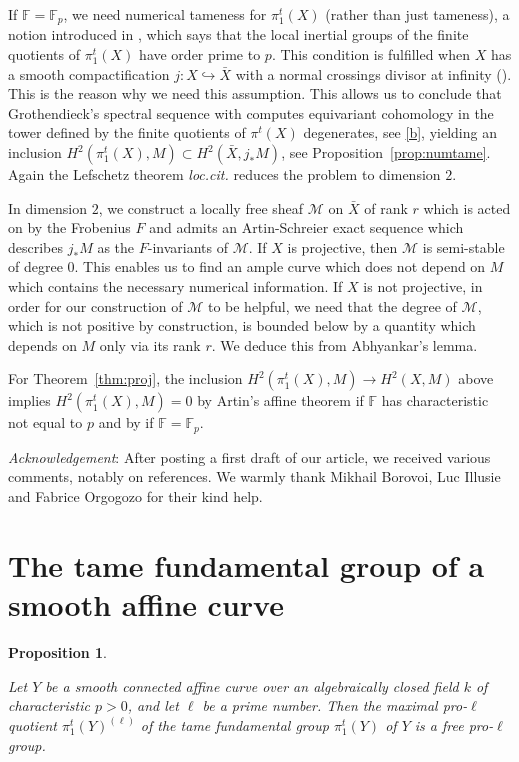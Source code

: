 \documentclass[12pt]{amsart}
\theoremstyle{plain}
\newtheorem{prop}[thm]{Proposition}
\theoremstyle{definition}
\numberwithin{thm}{section}
\newcommand{\sM}{{\mathcal M}}
\newcommand{\F}{{\mathbb F}}
\numberwithin{equation}{section}
\begin{document}
If $\F=\F_p$, we need numerical tameness for $\pi^t_1(X)$ (rather than just tameness), a notion introduced in \cite[Section~5]{KS10}, which says that the local inertial groups of the finite quotients of $\pi^t_1(X)$ have order prime to $p$. This condition is fulfilled when $X$ has a smooth compactification $j: X \hookrightarrow \bar X$ with a normal crossings divisor at infinity (\cite[Theorem~5.4 (a)]{KS10}). This is the reason why we need this assumption. This allows us to conclude that  Grothendieck's spectral sequence with computes equivariant cohomology  in the tower defined by the finite quotients of $\pi^t(X)$ degenerates, see \eqref{b}, yielding an inclusion
$H^2(\pi^t_1(X), M)\subset H^2(\bar X, j_*M)$, see Proposition~\ref{prop:numtame}.  Again the Lefschetz theorem {\it loc.cit.} reduces the problem to dimension $2$. 

In dimension $2$, we construct a locally free sheaf $\sM$ on $\bar X$ of rank $r$ which is acted on by the Frobenius $F$ and admits an Artin-Schreier exact sequence which describes $j_*M$ as the $F$-invariants of $\sM$. If $X$ is projective, then $\sM$ is semi-stable of degree $0$. This enables us to find an ample curve which does not depend on $M$ which contains the necessary numerical information.
 If $X$ is not projective, in order for our construction of $\sM$ to be helpful, we need that the degree of $\sM$, which is not positive by construction, is bounded below by a quantity which depends on $M$ only via its rank $r$. 
We deduce this from Abhyankar's lemma. 

For Theorem~\ref{thm:proj}, the inclusion $H^2(\pi^t_1(X), M) \to H^2(X, M)$ above implies $H^2(\pi^t_1(X), M) =0$ by Artin's affine theorem if $\F$ has characteristic not equal to $p$ and by \cite[Theorem 2]{Sha47} if $\F=\F_p$.

\medskip

{\it Acknowledgement}: After posting a first draft of our article, we received various comments, notably on references. We warmly thank Mikhail Borovoi, Luc Illusie and Fabrice Orgogozo for their kind help.

\section{The tame fundamental group of a smooth affine curve}

\begin{prop} \label{FreeQuotientsOfTameFundamentalGroup}

Let $Y$ be a smooth connected affine curve over an algebraically closed field $k$ of characteristic $p >0$, and let $\ell$ be a prime number. 
Then the maximal pro-$\ell$ quotient $\pi^t_1(Y)^{(\ell)}$ of the tame fundamental group $\pi_1^t(Y)$  of $Y$ is a free pro-$\ell$ group.

\end{prop}
\end{document}
